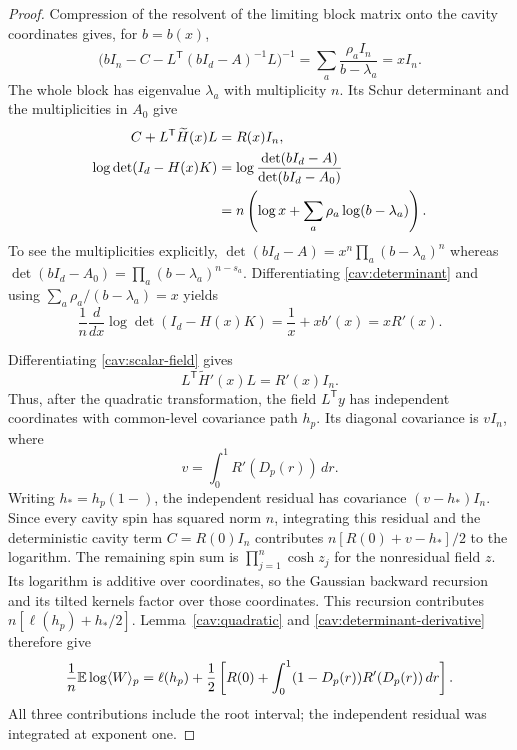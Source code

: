 \begin{proof}
Compression of the resolvent of the limiting block matrix onto the
cavity coordinates gives, for $b=b(x)$,
\begin{equation}\label{cav:compression}
 \big(bI_n-C-L^{\mathsf T}(bI_d-A)^{-1}L\big)^{-1}
 =\sum_a\frac{\rho_a I_n}{b-\lambda_a}=xI_n.
\end{equation}
The whole block has eigenvalue $\lambda_a$ with multiplicity $n$.
Its Schur determinant and the multiplicities in $A_0$ give
\begin{align}
 C+L^{\mathsf T}\widetilde H(x)L&=R(x)I_n,
       \label{cav:scalar-field}\\
 \log\det(I_d-H(x)K)
 &=\log\frac{\det(bI_d-A)}{\det(bI_d-A_0)}\notag\\
 &=n\left(\log x+\sum_a\rho_a\log(b-\lambda_a)\right).
       \label{cav:determinant}
\end{align}
To see the multiplicities explicitly,
$\det(bI_d-A)=x^n\prod_a(b-\lambda_a)^n$ whereas
$\det(bI_d-A_0)=\prod_a(b-\lambda_a)^{n-s_a}$.
Differentiating \eqref{cav:determinant} and using
$\sum_a\rho_a/(b-\lambda_a)=x$ yields
\begin{equation}\label{cav:determinant-derivative}
 \frac1n\frac{d}{dx}\log\det(I_d-H(x)K)
 =\frac1x+xb'(x)=xR'(x).
\end{equation}

Differentiating \eqref{cav:scalar-field} gives
\[
 L^{\mathsf T}\widetilde H'(x)L=R'(x)I_n.
\]
Thus, after the quadratic transformation, the field $L^{\mathsf T}y$
has independent coordinates with common-level covariance path $h_p$.
Its diagonal covariance is
$vI_n$, where
\[
 v=\int_0^1R'(D_p(r))\,dr.
\]
Writing $h_*=h_p(1-)$, the independent residual has covariance
$(v-h_*)I_n$.  Since every cavity spin has squared norm $n$,
integrating this residual and the deterministic cavity term
$C=R(0)I_n$ contributes $n[R(0)+v-h_*]/2$ to the logarithm.
The remaining spin sum is $\prod_{j=1}^n\cosh z_j$ for the
nonresidual field $z$.  Its logarithm is additive over coordinates,
so the Gaussian backward recursion and its tilted kernels factor over
those coordinates.  This recursion contributes
$n[\ell(h_p)+h_*/2]$.  Lemma~\ref{cav:quadratic} and
\eqref{cav:determinant-derivative} therefore give
\begin{equation}\label{cav:before-parts}
 \frac1n\mathbb E\log\langle W\rangle_p
 =\ell(h_p)+\frac12\left[
 R(0)+\int_0^1(1-D_p(r))R'(D_p(r))\,dr\right].
\end{equation}
All three contributions include the root interval; the independent
residual was integrated at exponent one.


\end{proof}
